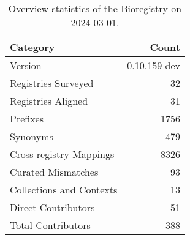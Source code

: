 \begin{table}
\caption{Overview statistics of the Bioregistry on 2024-03-01.}
\label{tab:bioregistry-summary}
\begin{tabular}{lr}
\toprule
Category & Count \\
\midrule
Version & 0.10.159-dev \\
Registries Surveyed & 32 \\
Registries Aligned & 31 \\
Prefixes & 1756 \\
Synonyms & 479 \\
Cross-registry Mappings & 8326 \\
Curated Mismatches & 93 \\
Collections and Contexts & 13 \\
Direct Contributors & 51 \\
Total Contributors & 388 \\
\bottomrule
\end{tabular}
\end{table}
